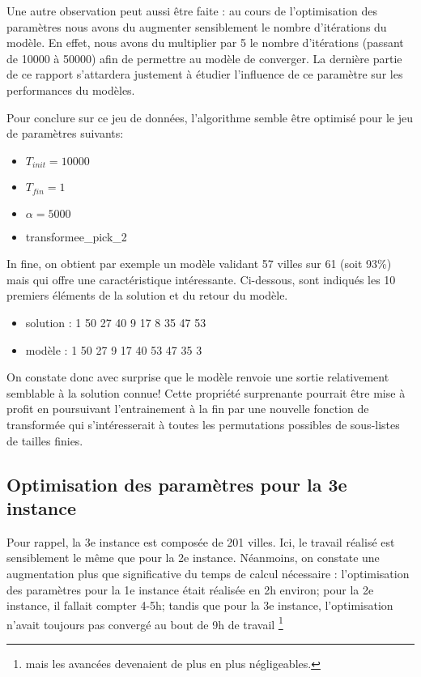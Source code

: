 \documentclass[a4paper, 12pt]{article}
\begin{document}
Une autre observation peut aussi être faite : au cours de l'optimisation des paramètres nous avons du augmenter sensiblement le nombre d'itérations du modèle. En effet, nous avons du multiplier par 5 le nombre d'itérations (passant de 10000 à 50000) afin de permettre au modèle de converger.
La dernière partie de ce rapport s'attardera justement à étudier l'influence de ce paramètre sur les performances du modèles.

Pour conclure sur ce jeu de données, l'algorithme semble être optimisé pour le jeu de paramètres suivants:
\begin{itemize}
    \item $T_{init} = 10000$
    \item $T_{fin} = 1$
    \item $\alpha = 5000$
    \item transformee\_pick\_2
\end{itemize}

In fine, on obtient par exemple un modèle validant 57 villes sur 61 (soit 93\%) mais qui offre une caractéristique intéressante. Ci-dessous, sont indiqués les 10 premiers éléments de la solution et du retour du modèle.
\begin{itemize}
    \item solution : 1 50 27 40 9  17 8  35 47 53
    \item modèle   : 1 50 27 9  17 40 53 47 35 3
\end{itemize}
On constate donc avec surprise que le modèle renvoie une sortie relativement semblable à la solution connue!
Cette propriété surprenante pourrait être mise à profit en poursuivant l'entrainement à la fin par une nouvelle fonction de transformée qui s'intéresserait à toutes les permutations possibles de sous-listes de tailles finies.


\subsection{Optimisation des paramètres pour la 3e instance}
Pour rappel, la 3e instance est composée de 201 villes.
Ici, le travail réalisé est sensiblement le même que pour la 2e instance. Néanmoins, on constate une augmentation plus que significative du temps de calcul nécessaire : l'optimisation des paramètres pour la 1e instance était réalisée en 2h environ; 
pour la 2e instance, il fallait compter 4-5h; tandis que pour la 3e instance, l'optimisation n'avait toujours pas convergé au bout de 9h de travail \footnote{mais les avancées devenaient de plus en plus négligeables.}
\end{document}
